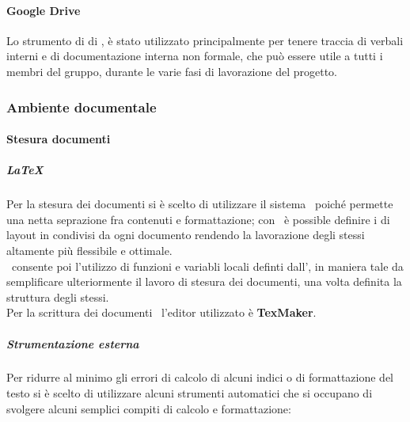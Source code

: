     \paragraph{Google Drive}
      Lo strumento di  di , è stato utilizzato principalmente per tenere traccia di verbali interni e di documentazione interna
      non formale, che può essere utile a tutti i membri del gruppo, durante le varie fasi di lavorazione del progetto.
  \subsubsection{Ambiente documentale}

    \paragraph{Stesura documenti}
      \subparagraph{\LaTeX}
        Per la stesura dei documenti si è scelto di utilizzare il sistema \glossaryItem{\LaTeX}\ poiché permette una netta seprazione fra contenuti
        e formattazione; con \glossaryItem{\LaTeX}\ è possible definire i  di layout in  condivisi da ogni documento rendendo la lavorazione
        degli stessi altamente più flessibile e ottimale.\\
        \glossaryItem{\LaTeX}\ consente poi l'utilizzo di funzioni e variabli locali definti dall', in maniera tale da semplificare ulteriormente
        il lavoro di stesura dei documenti, una volta definita la struttura degli stessi.\\
        Per la scrittura dei documenti \glossaryItem{\LaTeX}\ l'editor utilizzato è \textbf{TexMaker}.
      \subparagraph{Strumentazione esterna}
        Per ridurre al minimo gli errori di calcolo di alcuni indici o di formattazione del testo si è scelto di utilizzare alcuni strumenti
        automatici che si occupano di svolgere alcuni semplici compiti di calcolo e formattazione:
